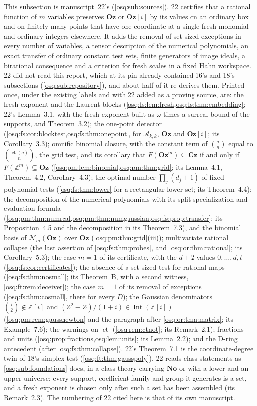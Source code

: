 \documentclass[11pt,letterpaper]{article}
\numberwithin{equation}{section}
\theoremstyle{definition}
\theoremstyle{remark}
\theoremstyle{plain}
\newcommand{\No}{\mathbf{No}}
\newcommand{\Oz}{\mathbf{Oz}}
\newcommand{\GOz}{\Oz[i]}
\newcommand{\Z}{\mathbb Z}
\newcommand{\A}{\mathcal A}          %
\newcommand{\ct}{\operatorname{ct}}
\newcommand{\Int}{\operatorname{Int}}
\newcommand{\Num}{\mathscr N}
\begin{document}
This subsection is manuscript~22's (\cref{osq:sub:sources}). 22 certifies that a rational function of $m$ variables preserves $\Oz$ or $\GOz$ by its
values on an ordinary box and on finitely many points that have one coordinate at a single fresh monomial and ordinary integers elsewhere. It adds
the removal of set-sized exceptions in every number of variables, a tensor description of the numerical polynomials, an exact transfer of ordinary
constant test sets, finite generators of image ideals, a birational consequence and a criterion for fresh scales in a fixed Hahn workspace. 22 did not
read this report, which at its pin already contained 16's and 18's subsections (\cref{osq:sub:repository}), and about half of it re-derives them.
Printed once, under the existing labels and with 22 added as a proving source, are: the fresh exponent and the Laurent blocks
(\cref{osq:fs:lem:fresh,osq:fs:thm:embedding}; 22's Lemma~3.1, with the fresh exponent built as $\omega$ times a surreal bound of the supports, and
Theorem~3.2); the one-point detector (\cref{osq:fs:cor:blocktest,osq:fs:thm:onepoint}, for $\A_{k,k}$, $\Oz$ and $\GOz$; its Corollary~3.3); omnific
binomial closure, with the constant term of $\binom an$ equal to $\binom{\ct(a)}n$, the grid test, and its corollary that
$F(\Oz^m)\subseteq\Oz$ if and only if $F(\Z^m)\subseteq\Oz$
(\cref{osq:pm:lem:binomial,osq:pm:thm:grid}; its Lemma~4.1, Theorem~4.2, Corollary~4.3); the optimal number $\prod_j(d_j+1)$ of fixed polynomial tests
(\cref{osq:fs:thm:lower} for a rectangular lower set; its Theorem~4.4); the decomposition of the numerical polynomials with its split specialization and
evaluation formula (\cref{osq:pm:thm:numreal,osq:pm:thm:numgaussian,osq:fs:prop:transfer}; its Proposition~4.5 and the decomposition in its Theorem~7.3),
and the binomial basis of $\Num_m(\Oz)$ over $\Oz$ (\cref{osq:pm:thm:grid}(iii)); multivariate rational collapse (the last assertion of
\cref{osq:fs:thm:probes}, and \cref{osq:or:thm:rational}; its Corollary~5.3); the case $m=1$ of its certificate, with the $d+2$ values $0,\dots,d,t$
(\cref{osq:fs:cor:certificates}); the absence of a set-sized test for rational maps (\cref{osq:fs:thm:nosmall}; its Theorem~B, with a second witness,
\cref{osq:ft:rem:deceiver}); the case $m=1$ of its removal of exceptions (\cref{osq:fs:thm:cosmall}, there for every $D$); the Gaussian denominators
$\binom i2\notin\Z[i]$ and $(Z^2-Z)/(1+i)\in\Int(\Z[i])$ (\cref{osq:pm:rem:gaussnewton} and the paragraph after \cref{osq:or:thm:matrix}; its
Example~7.6); the warnings on $\ct$ (\cref{osq:rem:ctnot}; its Remark~2.1); fractions and units (\cref{osq:prop:fractions,osq:lem:units}; its Lemma~2.2);
and the D-ring antecedent (after \cref{osq:fs:thm:collapse}). 22's Theorem~7.1 is the coordinate-degree twin of 18's simplex test
(\cref{osq:ft:thm:gausspoly}). 22 reads class statements as \cref{osq:sub:foundations} does, in a class theory carrying $\No$ or with a lower and an upper
universe; every support, coefficient family and group it generates is a set, and a fresh exponent is chosen only after such a set has been assembled
(its Remark~2.3). The numbering of 22 cited here is that of its own manuscript.
\end{document}
